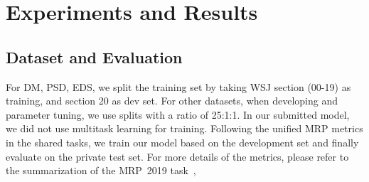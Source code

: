\section{Experiments and Results}
\label{sec:lex-phr:exp}

\subsection{Dataset and Evaluation}
\label{ssec:data_eval}

For DM, PSD, EDS, we split the training set by taking WSJ section
(00-19) as training, and section 20 as dev set. For other datasets,
when developing and parameter tuning, we use splits with a ratio of
25:1:1. In our submitted model, we did not use multitask learning for
training. Following the unified MRP metrics in the shared tasks, we train our
model based on the development set and finally evaluate on the private
test set.  For more details of the metrics, please refer to the
summarization of the MRP~2019 task~\cite{Oep:Abe:Haj:19},

